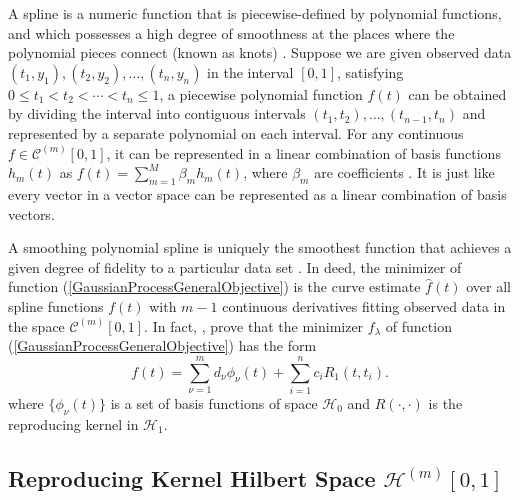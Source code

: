 A spline is a numeric function that is piecewise-defined by polynomial functions, and which possesses a high degree of smoothness at the places where the polynomial pieces connect (known as knots) \cite{judd1998numerical} \cite{chen2009feedback}. Suppose we are given observed data $(t_1,y_1),(t_2,y_2), \ldots, (t_n,y_n)$ in the interval $[0,1]$, satisfying $0\leq t_1< t_2 < \cdots <t_n \leq 1$, a piecewise polynomial function $f(t)$ can be obtained by dividing the interval into contiguous intervals $(t_1,t_2),\ldots,(t_{n-1},t_n)$ and represented by a separate polynomial on each interval. For any continuous $f\in \mathcal{C}^{(m)}[0,1]$, it can be represented in a linear combination of basis functions $h_m(t)$ as $f(t) =\sum_{m=1}^{M}\beta_mh_m(t)$, where $\beta_m$ are coefficients \cite{ellis2009}. It is just like every vector in a vector space can be represented as a linear combination of basis vectors. 



A smoothing polynomial spline is uniquely the smoothest function that achieves a given degree of fidelity to a particular data set \cite{whittaker1922new}. In deed, the minimizer of function (\ref{GaussianProcessGeneralObjective}) is the curve estimate $\hat{f}(t)$ over all spline functions $f(t)$ with $m-1$ continuous derivatives fitting observed data in the space $\mathcal{C}^{(m)}[0,1]$. In fact, \cite{kimeldorf1971some},  \cite{kimeldorf1970correspondence}  prove that the minimizer $f_\lambda$ of function (\ref{GaussianProcessGeneralObjective}) has the form 
\begin{equation}
f(t)=\sum_{\nu=1}^m d_\nu \phi_\nu(t)+\sum_{i=1}^n c_iR_1(t,t_i).
\end{equation}
where $\{\phi_\nu(t)\}$ is a set of basis functions of space $\mathcal{H}_0$ and $R(\cdot,\cdot)$ is the reproducing kernel in $\mathcal{H}_1$. 



\subsection{Reproducing Kernel Hilbert Space $\mathcal{H}^{(m)}[0,1]$}

